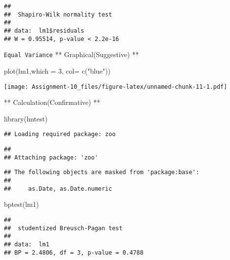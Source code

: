 \documentclass[
]{article}
\newenvironment{Shaded}{\begin{snugshade}}{\end{snugshade}}
\newcommand{\AttributeTok}[1]{\textcolor[rgb]{0.77,0.63,0.00}{#1}}
\newcommand{\DecValTok}[1]{\textcolor[rgb]{0.00,0.00,0.81}{#1}}
\newcommand{\FunctionTok}[1]{\textcolor[rgb]{0.00,0.00,0.00}{#1}}
\newcommand{\NormalTok}[1]{#1}
\newcommand{\SpecialCharTok}[1]{\textcolor[rgb]{0.00,0.00,0.00}{#1}}
\newcommand{\StringTok}[1]{\textcolor[rgb]{0.31,0.60,0.02}{#1}}
\begin{document}
\begin{Shaded}
\end{Shaded}

\begin{verbatim}
## 
##  Shapiro-Wilk normality test
## 
## data:  lm1$residuals
## W = 0.95514, p-value < 2.2e-16
\end{verbatim}

\texttt{Equal\ Variance} ** Graphical(Suggestive) **

\begin{Shaded}
\begin{Highlighting}[]
\FunctionTok{plot}\NormalTok{(lm1,}\AttributeTok{which =} \DecValTok{3}\NormalTok{, }\AttributeTok{col=} \FunctionTok{c}\NormalTok{(}\StringTok{"blue"}\NormalTok{))}
\end{Highlighting}
\end{Shaded}

\texttt{[image: Assignment-10\_files/figure-latex/unnamed-chunk-11-1.pdf]}

** Calculation(Confirmative) **

\begin{Shaded}
\begin{Highlighting}[]
\FunctionTok{library}\NormalTok{(lmtest)}
\end{Highlighting}
\end{Shaded}

\begin{verbatim}
## Loading required package: zoo
\end{verbatim}

\begin{verbatim}
## 
## Attaching package: 'zoo'
\end{verbatim}

\begin{verbatim}
## The following objects are masked from 'package:base':
## 
##     as.Date, as.Date.numeric
\end{verbatim}

\begin{Shaded}
\begin{Highlighting}[]
\FunctionTok{bptest}\NormalTok{(lm1)}
\end{Highlighting}
\end{Shaded}

\begin{verbatim}
## 
##  studentized Breusch-Pagan test
## 
## data:  lm1
## BP = 2.4806, df = 3, p-value = 0.4788
\end{verbatim}
\end{document}

